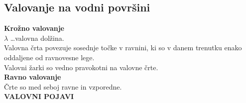 {\color{indiagreen}\subsection{Valovanje na vodni površini}}
\textbf{Krožno valovanje}\\
$\lambda$ \dots valovna dolžina.\\
Valovna črta povezuje sosednje točke v ravnini, ki so v danem trenutku enako oddaljene od ravnovesne lege.\\
Valovni žarki so vedno pravokotni na valovne črte.\\
\textbf{Ravno valovanje}\\
Črte so med seboj ravne in vzporedne.\\
\textbf{VALOVNI POJAVI}\\
